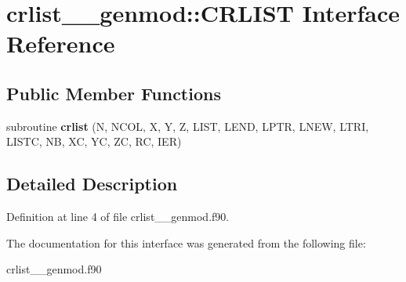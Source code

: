 \hypertarget{interfacecrlist____genmod_1_1_c_r_l_i_s_t}{\section{crlist\+\_\+\+\_\+genmod\+:\+:C\+R\+L\+I\+S\+T Interface Reference}
\label{interfacecrlist____genmod_1_1_c_r_l_i_s_t}
}
\subsection*{Public Member Functions}
\begin{DoxyCompactItemize}
\item 
\hypertarget{interfacecrlist____genmod_1_1_c_r_l_i_s_t_a5315c5a72a047d4d0446e096b51b262e}{subroutine {\bfseries crlist} (N, N\+C\+O\+L, X, Y, Z, L\+I\+S\+T, L\+E\+N\+D, L\+P\+T\+R, L\+N\+E\+W, L\+T\+R\+I, L\+I\+S\+T\+C, N\+B, X\+C, Y\+C, Z\+C, R\+C, I\+E\+R)}\label{interfacecrlist____genmod_1_1_c_r_l_i_s_t_a5315c5a72a047d4d0446e096b51b262e}

\end{DoxyCompactItemize}


\subsection{Detailed Description}


Definition at line 4 of file crlist\+\_\+\+\_\+genmod.\+f90.



The documentation for this interface was generated from the following file\+:\begin{DoxyCompactItemize}
\item 
crlist\+\_\+\+\_\+genmod.\+f90\end{DoxyCompactItemize}
